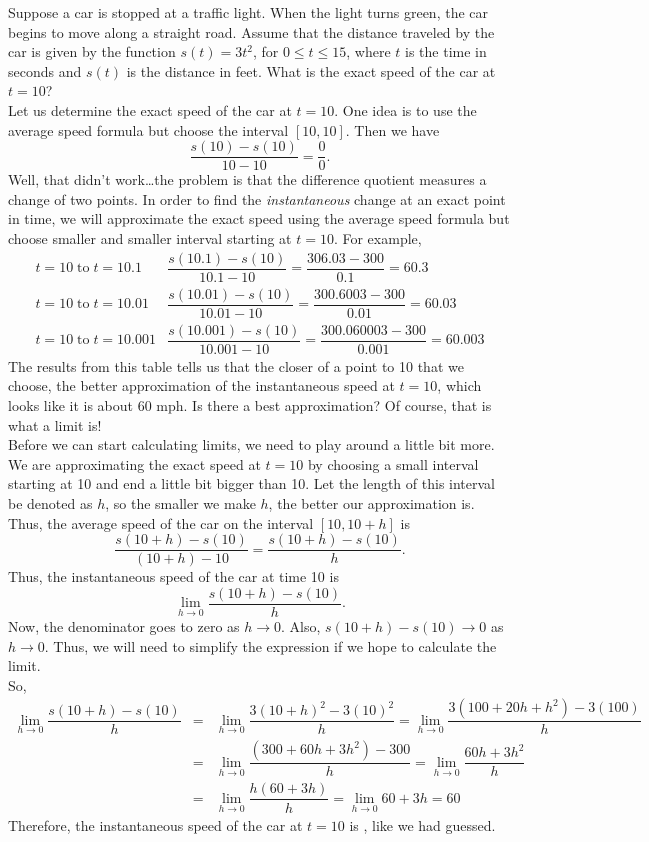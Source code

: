 \documentclass{book}
\begin{document}
\begin{Exam} Suppose a car is stopped at a traffic light. When the light turns green, the car begins to move along a straight road. Assume that the distance traveled by the car is given by the function $s(t) = 3t^2$, for $0\le t\le 15$, where $t$ is the time in seconds and $s(t)$ is the distance in feet. What is the exact speed of the car at $t=10$?\\

Let us determine the exact speed of the car at $t = 10$. One idea is to use the average speed formula but choose the interval $[10,10]$. Then we have \[\dfrac{s(10)-s(10)}{10-10} = \dfrac{0}{0}.\] Well, that didn't work\ldots the problem is that the difference quotient measures a change of two points. In order to find the \emph{instantaneous} change at an exact point in time, we will approximate the exact speed using the average speed formula but choose smaller and smaller interval starting at $t=10$. For example,
\[\begin{array}{ll} t=10\;\mbox{to}\; t = 10.1 & \dfrac{s(10.1)-s(10)}{10.1-10} = \dfrac{306.03-300}{0.1} = 60.3\\
t=10\;\mbox{to}\; t = 10.01 & \dfrac{s(10.01)-s(10)}{10.01-10} = \dfrac{300.6003-300}{0.01} = 60.03\\
t=10\;\mbox{to}\; t = 10.001 & \dfrac{s(10.001)-s(10)}{10.001-10} = \dfrac{300.060003-300}{0.001} = 60.003
\end{array}\] The results from this table tells us that the closer of a point to 10 that we choose, the better approximation of the instantaneous speed at $t=10$, which looks like it is about 60 mph. Is there a best approximation? Of course, that is what a limit is!\\

Before we can start calculating limits, we need to play around a little bit more. We are approximating the exact speed at $t=10$ by choosing a small interval starting at 10 and end a little bit bigger than 10. Let the length of this interval be denoted as $h$, so the smaller we make $h$, the better our approximation is. Thus, the average speed of the car on the interval $[10, 10+h]$ is \[\dfrac{s(10+h) - s(10)}{(10+h)-10} = \dfrac{s(10+h)-s(10)}{h}.\] Thus, the instantaneous speed of the car at time 10 is \[\lim_{h\to 0} \dfrac{s(10+h)-s(10)}{h}.\] Now, the denominator goes to zero as $h\to 0$. Also, $s(10+h) - s(10) \to 0$ as $h\to 0$. Thus, we will need to simplify the expression if we hope to calculate the limit.\\

So, 
\begin{eqnarray*}
\lim_{h\to 0} \dfrac{s(10+h)-s(10)}{h} &=& \lim_{h\to 0} \dfrac{3(10+h)^2 - 3(10)^2}{h} = \lim_{h\to 0} \dfrac{3(100 + 20h + h^2) - 3(100)}{h}\\
&=& \lim_{h\to 0} \dfrac{(300 + 60h + 3h^2)-300}{h} = \lim_{h\to 0} \dfrac{60h+3h^2}{h}\\
&=& \lim_{h\to 0} \dfrac{h(60+3h)}{h} = \lim_{h\to 0} 60 + 3h = 60
\end{eqnarray*}
Therefore, the instantaneous speed of the car at $t=10$ is , like we had guessed.
\end{Exam}\vs
\end{document}

